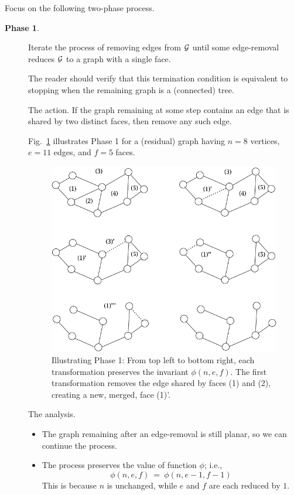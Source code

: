 \noindent
Focus on the following two-phase process.
\begin{description}
\item[{\bf Phase 1}.]
Iterate the process of removing edges from $\mbox{$\cal G$}$ until some edge-removal reduces $\mbox{$\cal G$}$ to a graph with a single face.

\smallskip

The reader should verify that this termination condition is equivalent to stopping when the remaining graph is a (connected) tree.

\medskip

{\sf The action}.
If the graph remaining at some step contains an edge that is shared by two distinct faces, then remove any such edge.

\smallskip

Fig.~\ref{fig:planarStep1} illustrates Phase 1 for a (residual) graph having $n=8$ vertices, $e=11$ edges, and $f=5$ faces.
\begin{figure}[hbt]
\begin{center}
   \includegraphics[scale=0.35]{FiguresGraph/planarStep1}
\caption{Illustrating Phase 1: From top left to bottom right, each transformation preserves the invariant $\phi(n,e,f)$.  The first transformation removes the edge shared by faces (1) and (2), creating a new, merged, face (1)'.}
  \label{fig:planarStep1}
\end{center}
\end{figure}

\medskip

{\sf The analysis}.
\begin{itemize}
\item
The graph remaining after an edge-removal is still planar, so we can continue the process.
\medskip\item
The process preserves the value of function $\phi$; i.e.,
\[ \phi(n,e,f) \ = \ \phi(n,e-1,f-1) \]
This is because $n$ is unchanged, while $e$ and $f$ are each reduced by $1$.
\end{itemize}


\end{description}
